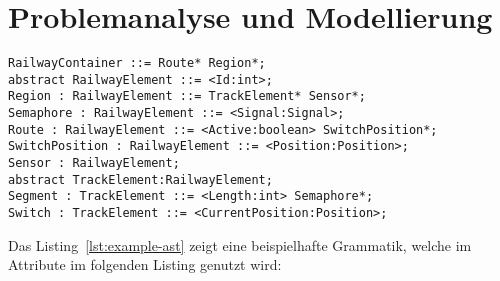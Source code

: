 \chapter{Problemanalyse und Modellierung}\label{ch:problemanalyse-und-modellierung}

\blindtext
{}

\begin{lstlisting}[language=AST,label={lst:example-ast},caption={Example AST}]
RailwayContainer ::= Route* Region*;
abstract RailwayElement ::= <Id:int>;
Region : RailwayElement ::= TrackElement* Sensor*;
Semaphore : RailwayElement ::= <Signal:Signal>;
Route : RailwayElement ::= <Active:boolean> SwitchPosition*;
SwitchPosition : RailwayElement ::= <Position:Position>;
Sensor : RailwayElement;
abstract TrackElement:RailwayElement;
Segment : TrackElement ::= <Length:int> Semaphore*;
Switch : TrackElement ::= <CurrentPosition:Position>;
\end{lstlisting}
%
Das Listing~\ref{lst:example-ast} zeigt eine beispielhafte Grammatik, welche im Attribute im folgenden Listing genutzt wird:


